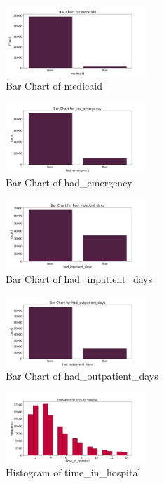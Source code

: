 \documentclass{article}%
\begin{document}
%


\begin{figure}[h!]%
\centering%
\includegraphics[width=200px]{eda/bar_charts/medicaid_bar_chart.png}%
\caption{Bar Chart of medicaid}%
\end{figure}

%


\begin{figure}[h!]%
\centering%
\includegraphics[width=200px]{eda/bar_charts/had_emergency_bar_chart.png}%
\caption{Bar Chart of had\_emergency}%
\end{figure}

%


\begin{figure}[h!]%
\centering%
\includegraphics[width=200px]{eda/bar_charts/had_inpatient_days_bar_chart.png}%
\caption{Bar Chart of had\_inpatient\_days}%
\end{figure}

%


\begin{figure}[h!]%
\centering%
\includegraphics[width=200px]{eda/bar_charts/had_outpatient_days_bar_chart.png}%
\caption{Bar Chart of had\_outpatient\_days}%
\end{figure}

%


\begin{figure}[h!]%
\centering%
\includegraphics[width=200px]{eda/histograms/time_in_hospital_histogram.png}%
\caption{Histogram of time\_in\_hospital}%
\end{figure}
\end{document}
